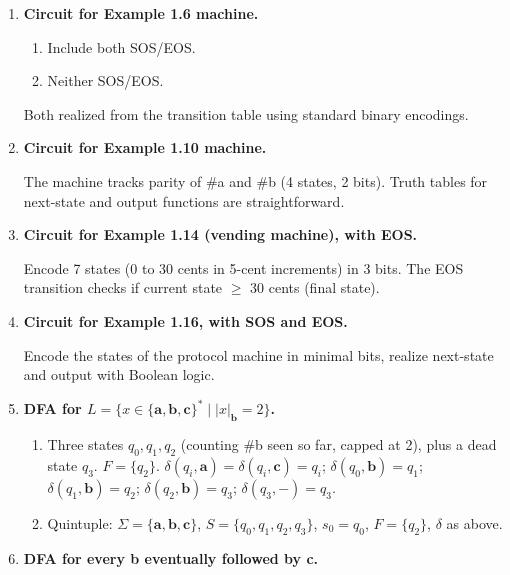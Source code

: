 \documentclass[11pt]{book}
\begin{document}
\begin{enumerate}[{1.}1.]
\item \textbf{Circuit for Example 1.6 machine.}
\begin{enumerate}
\item Include both SOS/EOS.
\item Neither SOS/EOS.
\end{enumerate}
Both realized from the transition table using standard binary encodings.

\item \textbf{Circuit for Example 1.10 machine.}

The machine tracks parity of \#a and \#b (4 states, 2 bits). Truth tables for next-state and output functions are straightforward.

\item \textbf{Circuit for Example 1.14 (vending machine), with EOS.}

Encode 7 states (0 to 30 cents in 5-cent increments) in 3 bits. The EOS transition checks if current state $\geq$ 30 cents (final state).

\item \textbf{Circuit for Example 1.16, with SOS and EOS.}

Encode the states of the protocol machine in minimal bits, realize next-state and output with Boolean logic.

\item \textbf{DFA for $L=\{x\in\{\mathbf{a},\mathbf{b},\mathbf{c}\}^*\mid|x|_\mathbf{b}=2\}$.}

\begin{enumerate}
\item Three states $q_0,q_1,q_2$ (counting \#b seen so far, capped at 2), plus a dead state $q_3$. $F=\{q_2\}$.
$\delta(q_i,\mathbf{a})=\delta(q_i,\mathbf{c})=q_i$; $\delta(q_0,\mathbf{b})=q_1$; $\delta(q_1,\mathbf{b})=q_2$; $\delta(q_2,\mathbf{b})=q_3$; $\delta(q_3,-)=q_3$.

\item Quintuple: $\Sigma=\{\mathbf{a},\mathbf{b},\mathbf{c}\}$, $S=\{q_0,q_1,q_2,q_3\}$, $s_0=q_0$, $F=\{q_2\}$, $\delta$ as above.
\end{enumerate}

\item \textbf{DFA for every \textbf{b} eventually followed by \textbf{c}.}


\end{enumerate}
\end{document}
